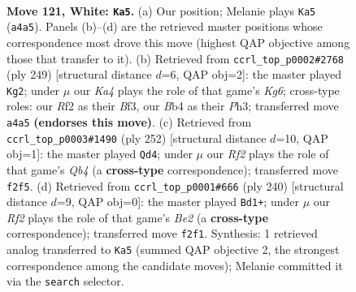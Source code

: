\documentclass[11pt]{article}
\begin{document}
\clearpage

\begin{figure}[p]\centering
\begin{subfigure}{0.46\textwidth}\centering
\resizebox{\linewidth}{!}{%
\newchessgame
\chessboard[
  setfen={7k/8/7r/8/KB6/8/5R2/8 w - - 9 121},
  showmover=false,
  pgfstyle=straightmove, color=movearrow, markmove={a4-a5}
]}
\caption{}
\end{subfigure}\hfill
\begin{subfigure}{0.46\textwidth}\centering
\resizebox{\linewidth}{!}{%
\newchessgame
\chessboard[
  setfen={3R4/8/8/8/8/5bkp/3K4/8 b - - 2 125},
  showmover=false,
  pgfstyle=straightmove, color=movearrow, markmove={g3-g2}
]}
\caption{}
\end{subfigure}
\\[4pt]
\begin{subfigure}{0.46\textwidth}\centering
\resizebox{\linewidth}{!}{%
\newchessgame
\chessboard[
  setfen={8/8/8/8/1Q6/3K4/k5r1/8 w - - 29 127},
  showmover=false,
  pgfstyle=straightmove, color=movearrow, markmove={b4-d4}
]}
\caption{}
\end{subfigure}\hfill
\begin{subfigure}{0.46\textwidth}\centering
\resizebox{\linewidth}{!}{%
\newchessgame
\chessboard[
  setfen={8/8/2KB4/8/k7/8/4B3/8 w - - 19 121},
  showmover=false,
  pgfstyle=straightmove, color=movearrow, markmove={e2-d1}
]}
\caption{}
\end{subfigure}
\caption{\textbf{Move 121, White: \texttt{Ka5}.} (a) Our position; Melanie plays \texttt{Ka5} (\texttt{a4a5}). Panels (b)--(d) are the retrieved master positions whose correspondence most drove this move (highest QAP objective among those that transfer to it). (b) Retrieved from \texttt{ccrl\_top\_p0002\#2768} (ply 249) [structural distance $d$=6, QAP obj=2]: the master played \texttt{Kg2}; under $\mu$ our \emph{Ka4} plays the role of that game's \emph{Kg6}; cross-type roles: our \emph{R}f2 as their \emph{B}f3, our \emph{B}b4 as their \emph{P}h3; transferred move \texttt{a4a5} \textbf{(endorses this move)}. (c) Retrieved from \texttt{ccrl\_top\_p0003\#1490} (ply 252) [structural distance $d$=10, QAP obj=1]: the master played \texttt{Qd4}; under $\mu$ our \emph{Rf2} plays the role of that game's \emph{Qb4} (a \textbf{cross-type} correspondence); transferred move \texttt{f2f5}. (d) Retrieved from \texttt{ccrl\_top\_p0001\#666} (ply 240) [structural distance $d$=9, QAP obj=0]: the master played \texttt{Bd1+}; under $\mu$ our \emph{Rf2} plays the role of that game's \emph{Be2} (a \textbf{cross-type} correspondence); transferred move \texttt{f2f1}. Synthesis: 1 retrieved analog transferred to \texttt{Ka5} (summed QAP objective 2, the strongest correspondence among the candidate moves); Melanie committed it via the \texttt{search} selector.}
\label{fig:thought-m240}
\end{figure}
\end{document}
